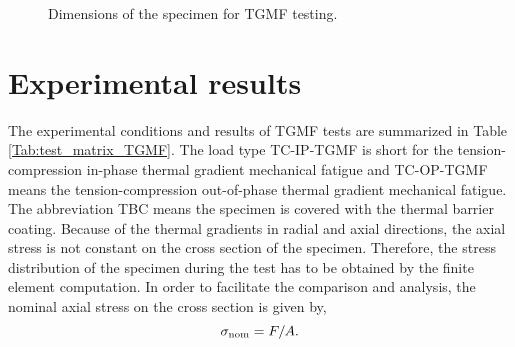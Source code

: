 


\begin{figure}[!htp]
\caption{Dimensions of the specimen for TGMF testing.}
\label{Fig:IN718_Axial_Specimen_TGMF}
\end{figure}

\section{Experimental results}
\noindent
The experimental conditions and results of TGMF tests are summarized in Table \ref{Tab:test_matrix_TGMF}. The load type TC-IP-TGMF is short for the tension-compression in-phase thermal gradient mechanical fatigue and TC-OP-TGMF means the tension-compression out-of-phase thermal gradient mechanical fatigue. The abbreviation TBC means the specimen is covered with the thermal barrier coating.
Because of the thermal gradients in radial and axial directions, the axial stress is not constant on the cross section of the specimen.
Therefore, the stress distribution of the specimen during the test has to be obtained by the finite element computation.
In order to facilitate the comparison and analysis, the nominal axial stress on the cross section is given by,
\[\sigma_{\rm{nom}} = F/A.\]

